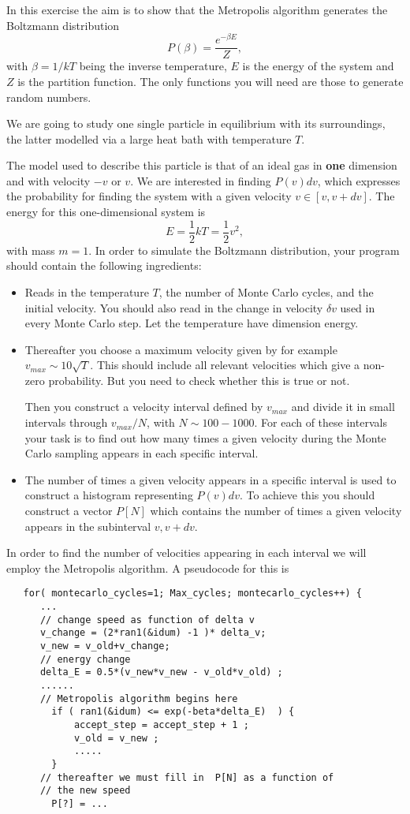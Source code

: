 \begin{prob}
In this exercise the aim is to show that the Metropolis algorithm
generates the Boltzmann distribution
\[
   P(\beta)=\frac{e^{-\beta E}}{Z},
\]
with $\beta=1/kT$ being the inverse temperature, $E$ is the energy of
the system and
$Z$ is the partition function. The only functions you will need are those
to generate random numbers.

We are going to study one single particle in equilibrium with 
its surroundings, the latter modelled via a large heat bath
with temperature $T$.

The model used to describe this particle is that of an ideal gas
in {\bf one} dimension and with velocity $-v$ or $v$. 
We are interested in finding  $P(v)dv$, which expresses the probability
for finding the system with a given velocity $v\in [v,v+dv]$.
The energy for this one-dimensional system is
\[
  E=\frac{1}{2}kT=\frac{1}{2}v^2,
\]
with mass $m=1$.
In order to simulate the Boltzmann distribution, your program
should contain the following ingredients:  
\begin{itemize}
\item Reads in the temperature $T$, the number of Monte Carlo cycles, 
and the initial velocity. You should also read in 
the change in velocity $\delta v$ used in every Monte Carlo step. 
Let the temperature have dimension energy.
\item Thereafter you choose a maximum velocity given by for example  
$v_{max}\sim 10\sqrt{T}$. This should include all relevant velocities which give a non-zero probability. But you need to check whether this is true or not. 

Then you construct a velocity interval 
defined by  $v_{max}$ and divide it in small intervals through 
$v_{max}/N$,
with $N\sim 100-1000$. 
For each of these intervals your task is to find out how many times
a given velocity during the Monte Carlo sampling appears 
in each specific interval.
\item The number of times a given velocity appears in a specific
interval is used to construct a histogram representing 
$P(v)dv$. To achieve this you should construct a vector 
$P[N]$ which contains the number of times a given velocity 
appears in the subinterval 
$v,v+dv$. 
\end{itemize}

In order to find the number of velocities appearing in each interval
we will employ the Metropolis algorithm. A pseudocode for this is
\begin{lstlisting}
   for( montecarlo_cycles=1; Max_cycles; montecarlo_cycles++) {
      ...
      // change speed as function of delta v
      v_change = (2*ran1(&idum) -1 )* delta_v;
      v_new = v_old+v_change;
      // energy change
      delta_E = 0.5*(v_new*v_new - v_old*v_old) ;
      ......
      // Metropolis algorithm begins here
        if ( ran1(&idum) <= exp(-beta*delta_E)  ) {
            accept_step = accept_step + 1 ;      
            v_old = v_new ;
            .....
        }
      // thereafter we must fill in  P[N] as a function of
      // the new speed
        P[?] = ...


\end{lstlisting}
\end{prob}
